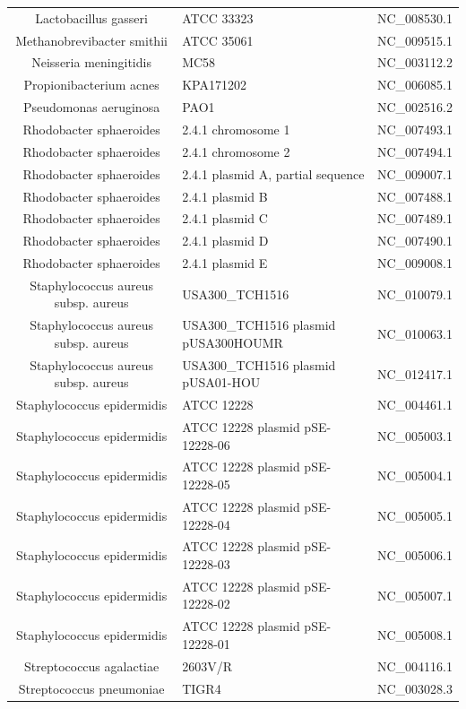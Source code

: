 \documentclass[10pt]{bmc_article}
\newenvironment{bmcformat}{\begin{raggedright}\baselineskip20pt\sloppy\setboolean{publ}{false}}{\end{raggedright}\baselineskip20pt\sloppy}
\begin{document}
\begin{bmcformat}
{\begin{tabular}{|c|p{5cm}|c|}
        Lactobacillus gasseri & ATCC 33323 &      NC\_008530.1 \\
        Methanobrevibacter smithii & ATCC 35061 &  NC\_009515.1 \\
        Neisseria meningitidis & MC58 &   NC\_003112.2 \\
        Propionibacterium acnes & KPA171202 &     NC\_006085.1 \\
        Pseudomonas aeruginosa &  PAO1 &   NC\_002516.2 \\
        Rhodobacter sphaeroides & 2.4.1 chromosome 1 &  NC\_007493.1 \\
        Rhodobacter sphaeroides & 2.4.1 chromosome 2 &  NC\_007494.1 \\
        Rhodobacter sphaeroides & 2.4.1 plasmid A, partial sequence &      NC\_009007.1 \\
        Rhodobacter sphaeroides & 2.4.1 plasmid B &     NC\_007488.1 \\
        Rhodobacter sphaeroides & 2.4.1 plasmid C &     NC\_007489.1 \\
        Rhodobacter sphaeroides & 2.4.1 plasmid D &     NC\_007490.1 \\
        Rhodobacter sphaeroides & 2.4.1 plasmid E &     NC\_009008.1 \\
        Staphylococcus aureus subsp. aureus & USA300\_TCH1516 &    NC\_010079.1 \\
        Staphylococcus aureus subsp. aureus & USA300\_TCH1516 plasmid pUSA300HOUMR &      NC\_010063.1 \\
        Staphylococcus aureus subsp. aureus & USA300\_TCH1516 plasmid pUSA01-HOU &       NC\_012417.1 \\
        Staphylococcus epidermidis & ATCC 12228 &  NC\_004461.1 \\
        Staphylococcus epidermidis & ATCC 12228 plasmid pSE-12228-06 &   NC\_005003.1 \\
        Staphylococcus epidermidis & ATCC 12228 plasmid pSE-12228-05 &   NC\_005004.1 \\
        Staphylococcus epidermidis & ATCC 12228 plasmid pSE-12228-04 &   NC\_005005.1 \\
        Staphylococcus epidermidis & ATCC 12228 plasmid pSE-12228-03 &   NC\_005006.1 \\
        Staphylococcus epidermidis & ATCC 12228 plasmid pSE-12228-02 &   NC\_005007.1 \\
        Staphylococcus epidermidis & ATCC 12228 plasmid pSE-12228-01 &   NC\_005008.1 \\
        Streptococcus agalactiae & 2603V/R & NC\_004116.1 \\
        Streptococcus pneumoniae & TIGR4 & NC\_003028.3 \\
	\hline
      \end{tabular}
      }

\end{bmcformat}
\end{document}
